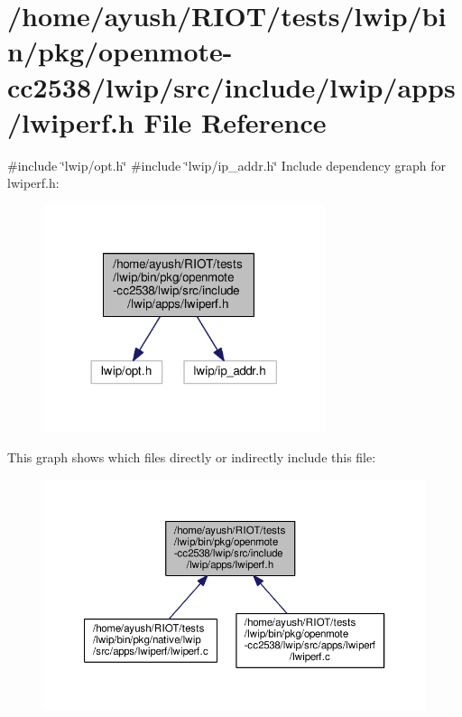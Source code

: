 \hypertarget{openmote-cc2538_2lwip_2src_2include_2lwip_2apps_2lwiperf_8h}{}\section{/home/ayush/\+R\+I\+O\+T/tests/lwip/bin/pkg/openmote-\/cc2538/lwip/src/include/lwip/apps/lwiperf.h File Reference}
\label{openmote-cc2538_2lwip_2src_2include_2lwip_2apps_2lwiperf_8h}
{\ttfamily \#include \char`\"{}lwip/opt.\+h\char`\"{}}\newline
{\ttfamily \#include \char`\"{}lwip/ip\+\_\+addr.\+h\char`\"{}}\newline
Include dependency graph for lwiperf.\+h\+:
\nopagebreak
\begin{figure}[H]
\begin{center}
\leavevmode
\includegraphics[width=234pt]{openmote-cc2538_2lwip_2src_2include_2lwip_2apps_2lwiperf_8h__incl}
\end{center}
\end{figure}
This graph shows which files directly or indirectly include this file\+:
\nopagebreak
\begin{figure}[H]
\begin{center}
\leavevmode
\includegraphics[width=350pt]{openmote-cc2538_2lwip_2src_2include_2lwip_2apps_2lwiperf_8h__dep__incl}
\end{center}
\end{figure}
